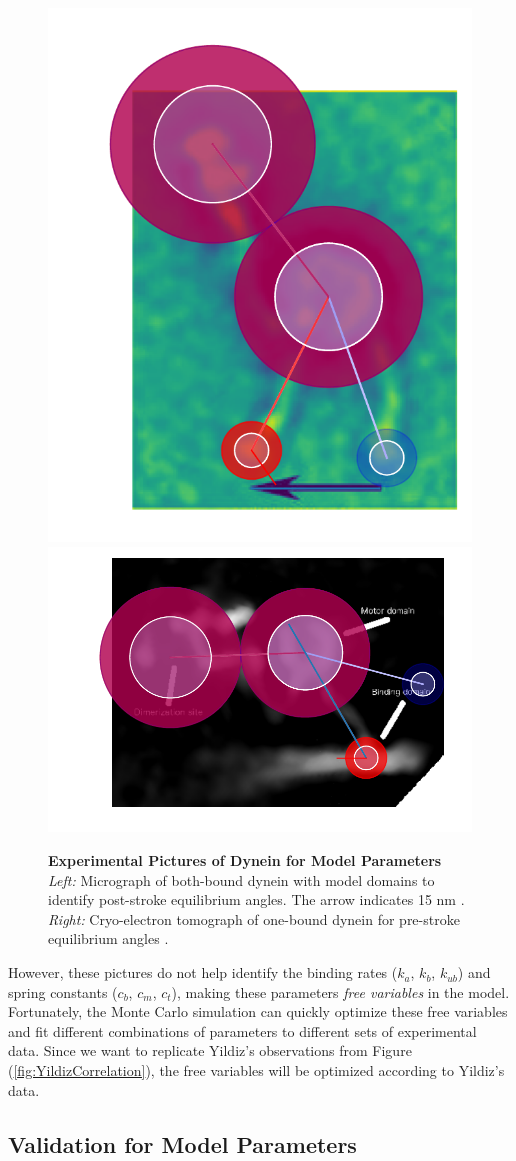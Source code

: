 \begin{figure}[hbt!]
	\centering
	\includegraphics[width=0.3\columnwidth]{../../plots/burgess-model-figure.pdf}
	\includegraphics[width=0.5\columnwidth]{../../plots/grotjahn-model-figure.pdf}%
	\caption[Experimental Pictures of Dynein for Model Parameters]{\textbf{Experimental Pictures of Dynein for Model Parameters} \textit{Left:} Micrograph of both-bound dynein with model domains to identify post-stroke equilibrium angles. The arrow indicates 15 nm \cite{Burgess2003}.  \textit{Right:} Cryo-electron tomograph of one-bound dynein for pre-stroke equilibrium angles \cite{grotjahn2018cryo}.} 
	\label{fig:ParamsPics}
\end{figure}

However, these pictures do not help identify the binding rates ($k_a$, $k_b$, $k_{ub}$) and spring constants ($c_b$, $c_m$, $c_t$), making these parameters \textit{free variables} in the model. Fortunately, the Monte Carlo simulation can quickly optimize these free variables and fit different combinations of parameters to  different sets of experimental data. Since we want to replicate Yildiz's observations from Figure (\ref{fig:YildizCorrelation}), the free variables will be optimized according to Yildiz's data. %

\subsection{Validation for Model Parameters}

